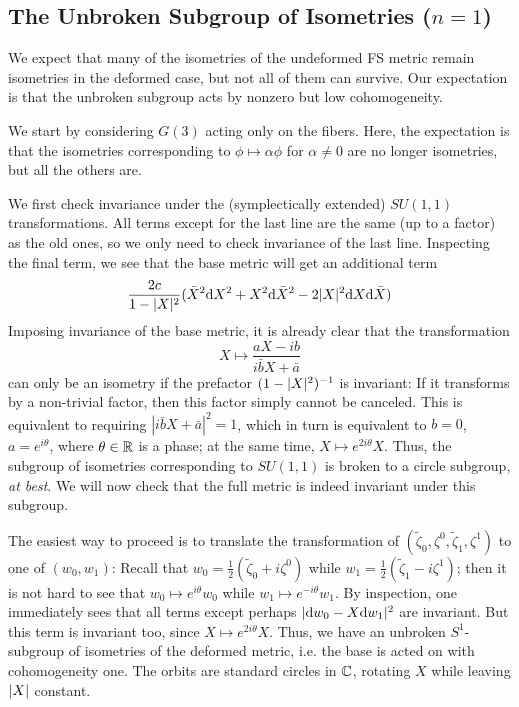 \documentclass[parskip=half]{scrartcl}
\begin{document}
\subsection{The Unbroken Subgroup of Isometries (\texorpdfstring{$n=1$}{n=1})}

We expect that many of the isometries of the undeformed FS metric remain isometries in the deformed case, but not all of them can survive. Our expectation is that the unbroken subgroup acts by nonzero but low cohomogeneity.

We start by considering $G(3)$ acting only on the fibers. Here, the expectation is that the isometries corresponding to $\phi\mapsto \alpha\phi$ for $\alpha\neq 0$ are no longer isometries, but all the others are.

We first check invariance under the (symplectically extended) $SU(1,1)$ transformations. All terms except for the last line are the same (up to a factor) as the old ones, so we only need to check invariance of the last line. Inspecting the final term, we see that the base metric will get an additional term
\begin{equation*}
	\frac{2c}{1-\lvert X \rvert^2}(\bar X^2 \mathrm{d} X^2+ X^2\mathrm{d} \bar X^2-2\lvert X \rvert^2\mathrm{d} X \mathrm{d} \bar X)
\end{equation*}
Imposing invariance of the base metric, it is already clear that the transformation
\begin{equation*}
	X\longmapsto \frac{aX-ib}{i\bar b X+\bar a}
\end{equation*}
can only be an isometry if the prefactor $(1-\lvert X \rvert^2)^{-1}$ is invariant: If it transforms by a non-trivial factor, then this factor simply cannot be canceled. This is equivalent to requiring $|i\bar b X+\bar a|^2=1$, which in turn is equivalent to $b=0$, $a=e^{i\theta}$, where $\theta\in \mathbb{R}$ is a phase; at the same time, $X\mapsto e^{2i\theta}X$. Thus, the subgroup of isometries corresponding to $SU(1,1)$ is broken to a circle subgroup, \emph{at best}. We will now check that the full metric is indeed invariant under this subgroup.

The easiest way to proceed is to translate the transformation of $(\tilde\zeta_0,\zeta^0,\tilde\zeta_1,\zeta^1)$ to one of $(w_0,w_1)$: Recall that $w_0=\frac{1}{2}(\tilde\zeta_0+i\zeta^0)$ while $w_1=\frac{1}{2}(\tilde\zeta_1-i\zeta^1)$; then it is not hard to see that $w_0\mapsto e^{i\theta}w_0$ while $w_1\mapsto e^{-i\theta}w_1$. By inspection, one immediately sees that all terms except perhaps $\lvert \mathrm{d} w_0-X\mathrm{d} w_1 \rvert^2$ are invariant. But this term is invariant too, since $X\mapsto e^{2i\theta}X$. Thus, we have an unbroken $S^1$-subgroup of isometries of the deformed metric, i.e. the base is acted on with cohomogeneity one. The orbits are standard circles in $\mathbb{C}$, rotating $X$ while leaving $\lvert X \rvert$ constant.
\end{document}
